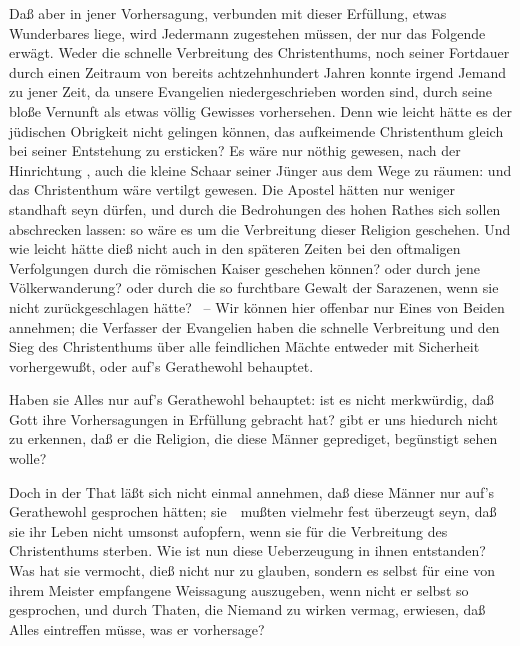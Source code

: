 \begin{aufza}
\item Daß aber in jener Vorhersagung, verbunden mit dieser Erfüllung, etwas Wunderbares liege, wird Jedermann zugestehen müssen, der nur das Folgende erwägt. Weder die schnelle Verbreitung des Christenthums, noch seiner Fortdauer durch einen Zeitraum von bereits achtzehnhundert Jahren konnte irgend Jemand zu jener Zeit, da unsere Evangelien niedergeschrieben worden sind, durch seine bloße Vernunft als etwas völlig Gewisses vorhersehen. Denn wie leicht hätte es der jüdischen Obrigkeit nicht gelingen können, das aufkeimende Christenthum gleich bei seiner Entstehung zu ersticken? Es wäre nur nöthig gewesen, nach der Hinrichtung , auch die kleine Schaar seiner Jünger aus dem Wege zu räumen: und das Christenthum wäre vertilgt gewesen. Die Apostel hätten nur weniger standhaft seyn dürfen, und durch die Bedrohungen des hohen Rathes sich sollen abschrecken lassen: so wäre es um die Verbreitung dieser Religion geschehen. Und wie leicht hätte dieß nicht auch in den späteren Zeiten bei den oftmaligen Verfolgungen durch die römischen Kaiser geschehen können? oder durch jene Völkerwanderung? oder durch die so furchtbare Gewalt der Sarazenen, wenn sie nicht  zurückgeschlagen hätte? \usw\ -- Wir können hier offenbar nur Eines von Beiden annehmen; die Verfasser der Evangelien haben die schnelle Verbreitung und den Sieg des Christenthums über alle feindlichen Mächte entweder mit Sicherheit vorhergewußt, oder auf's Gerathewohl behauptet.
\begin{aufzb}
\item Haben sie Alles nur auf's Gerathewohl behauptet: ist es nicht merkwürdig, daß Gott ihre Vorhersagungen in Erfüllung gebracht hat? gibt er uns hiedurch nicht zu erkennen, daß er die Religion, die diese Männer geprediget, begünstigt sehen wolle?
\item Doch in der That läßt sich nicht einmal annehmen, daß diese Männer nur auf's Gerathewohl gesprochen hätten; sie~\ mußten vielmehr fest überzeugt seyn, daß sie ihr Leben nicht umsonst aufopfern, wenn sie für die Verbreitung des Christenthums sterben. Wie ist nun diese Ueberzeugung in ihnen entstanden? Was hat sie vermocht, dieß nicht nur zu glauben, sondern es selbst für eine von ihrem Meister empfangene Weissagung auszugeben, wenn nicht er selbst so gesprochen, und durch Thaten, die Niemand zu wirken vermag, erwiesen, daß Alles eintreffen müsse, was er vorhersage?
\end{aufzb}
\end{aufza}

